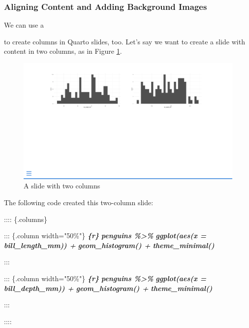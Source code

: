 \documentclass[
]{book}
\newenvironment{Shaded}{\begin{snugshade}}{\end{snugshade}}
\newcommand{\InformationTok}[1]{\textcolor[rgb]{0.56,0.35,0.01}{\textbf{\textit{#1}}}}
\newcommand{\NormalTok}[1]{#1}
\begin{document}
\hypertarget{aligning-content-and-adding-background-images}{%
\subsubsection*{Aligning Content and Adding Background Images}\label{aligning-content-and-adding-background-images}}

We can use a

to create columns in Quarto slides, too. Let's say we want to create a slide with content in two columns, as in Figure \ref{fig:quarto-slides-two-columns}.

\begin{figure}
\includegraphics[width=1\linewidth]{assets/quarto-slides-two-columns} \caption{A slide with two columns}\label{fig:quarto-slides-two-columns}
\end{figure}

The following code created this two-column slide:

\begin{Shaded}
\begin{Highlighting}[]
\NormalTok{:::: \{.columns\}}

\NormalTok{::: \{.column width="50\%"\}}
\InformationTok{\textasciigrave{}\textasciigrave{}\textasciigrave{}\{r\}}
\InformationTok{penguins \%\textgreater{}\% }
\InformationTok{  ggplot(aes(x = bill\_length\_mm)) +}
\InformationTok{  geom\_histogram() +}
\InformationTok{  theme\_minimal()}
\InformationTok{\textasciigrave{}\textasciigrave{}\textasciigrave{}}

\NormalTok{:::}

\NormalTok{::: \{.column width="50\%"\}}
\InformationTok{\textasciigrave{}\textasciigrave{}\textasciigrave{}\{r\}}
\InformationTok{penguins \%\textgreater{}\% }
\InformationTok{  ggplot(aes(x = bill\_depth\_mm)) +}
\InformationTok{  geom\_histogram() +}
\InformationTok{  theme\_minimal()}
\InformationTok{\textasciigrave{}\textasciigrave{}\textasciigrave{}}

\NormalTok{:::}

\NormalTok{::::}
\end{Highlighting}
\end{Shaded}
\end{document}
